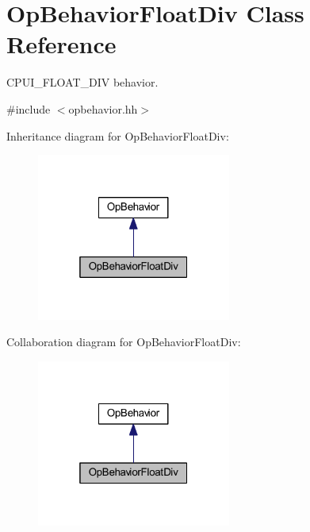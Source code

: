 \hypertarget{class_op_behavior_float_div}{}\section{Op\+Behavior\+Float\+Div Class Reference}
\label{class_op_behavior_float_div}


C\+P\+U\+I\+\_\+\+F\+L\+O\+A\+T\+\_\+\+D\+IV behavior.  




{\ttfamily \#include $<$opbehavior.\+hh$>$}



Inheritance diagram for Op\+Behavior\+Float\+Div\+:
\nopagebreak
\begin{figure}[H]
\begin{center}
\leavevmode
\includegraphics[width=181pt]{class_op_behavior_float_div__inherit__graph}
\end{center}
\end{figure}


Collaboration diagram for Op\+Behavior\+Float\+Div\+:
\nopagebreak
\begin{figure}[H]
\begin{center}
\leavevmode
\includegraphics[width=181pt]{class_op_behavior_float_div__coll__graph}
\end{center}
\end{figure}
